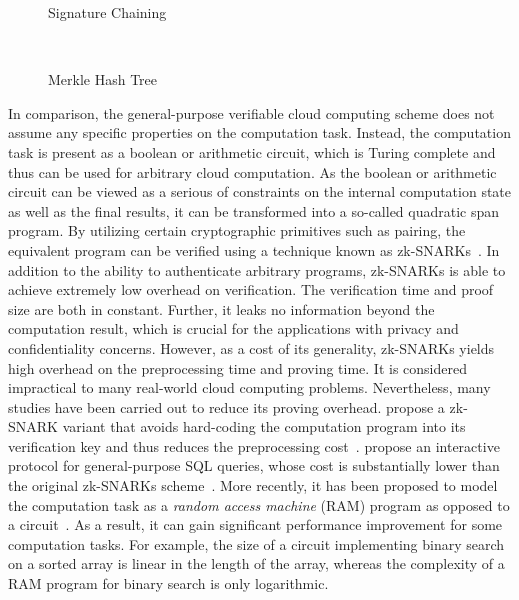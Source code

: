 \begin{figure}[t]
    \centering
    \begin{minipage}[b]{0.5\linewidth}
        \centering
        \resizebox{.7\linewidth}{!}{}
        \caption{Signature Chaining}\label{fig:related-works:chain}
    \end{minipage}~%
    \begin{minipage}[b]{0.5\linewidth}
        \centering
        \resizebox{\linewidth}{!}{}
        \caption{Merkle Hash Tree}\label{fig:related-works:mht}
    \end{minipage}
\end{figure}

In comparison, the general-purpose verifiable cloud computing scheme does not assume any specific properties on the computation task. Instead, the computation task is present as a boolean or arithmetic circuit, which is Turing complete and thus can be used for arbitrary cloud computation. As the boolean or arithmetic circuit can be viewed as a serious of constraints on the internal computation state as well as the final results, it can be transformed into a so-called quadratic span program. By utilizing certain cryptographic primitives such as pairing, the equivalent program can be verified using a technique known as zk-SNARKs~\cite{10.1109/sp.2013.47}. In addition to the ability to authenticate arbitrary programs, zk-SNARKs is able to achieve extremely low overhead on verification. The verification time and proof size are both in constant. Further, it leaks no information beyond the computation result, which is crucial for the applications with privacy and confidentiality concerns. However, as a cost of its generality, zk-SNARKs yields high overhead on the preprocessing time and proving time. It is considered impractical to many real-world cloud computing problems. Nevertheless, many studies have been carried out to reduce its proving overhead. \citeauthor{Ben-Sasson:2014:SNZ:2671225.2671275} propose a zk-SNARK variant that avoids hard-coding the computation program into its verification key and thus reduces the preprocessing cost~\cite{Ben-Sasson:2014:SNZ:2671225.2671275}. \citeauthor{10.1109/sp.2017.43} propose an interactive protocol for general-purpose SQL queries, whose cost is substantially lower than the original zk-SNARKs scheme~\cite{10.1109/sp.2017.43}. More recently, it has been proposed to model the computation task as a \emph{random access machine} (RAM) program as opposed to a circuit~\cite{10.1145/2517349.2522733,10.1007/978-3-642-40084-1_6,10.1109/sp.2018.00013}. As a result, it can gain significant performance improvement for some computation tasks. For example, the size of a circuit implementing binary search on a sorted array is linear in the length of the array, whereas the complexity of a RAM program for binary search is only logarithmic.

